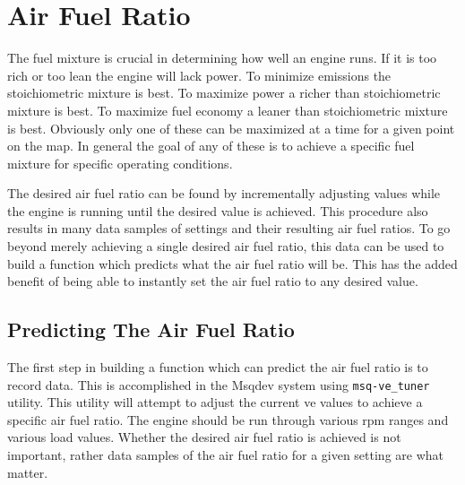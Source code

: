 \documentclass{article}
\begin{document}


\section{Air Fuel Ratio}
\label{sec:afr}

The fuel mixture is crucial in determining how well an engine runs.
If it is too rich or too lean the engine will lack power.
To minimize emissions the stoichiometric mixture is best.
To maximize power a richer than stoichiometric mixture is best.
To maximize fuel economy a leaner than stoichiometric mixture is best.
Obviously only one of these can be maximized at a time for a given
point on the map.
In general the goal of any of these is to achieve a specific fuel
mixture for specific operating conditions.

The desired air fuel ratio can be found by incrementally adjusting
values while the engine is running until the desired value is achieved.
This procedure also results in many data samples of settings and their
resulting air fuel ratios.
To go beyond merely achieving a single desired air fuel ratio, this data
can be used to build a function which predicts what the air
fuel ratio will be.
This has the added benefit of being able to instantly set the air fuel ratio
to any desired value.

\subsection{Predicting The Air Fuel Ratio}
\label{sec:predafr}

The first step in building a function which can predict the air fuel ratio
is to record data.
This is accomplished in the Msqdev system using \verb+msq-ve_tuner+ utility.
This utility will attempt to adjust the current ve values to achieve
a specific air fuel ratio.
The engine should be run through various rpm ranges and various load values.
Whether the desired air fuel ratio is achieved is not important,
rather data samples of the air fuel ratio for a given setting are what
matter.
\end{document}
